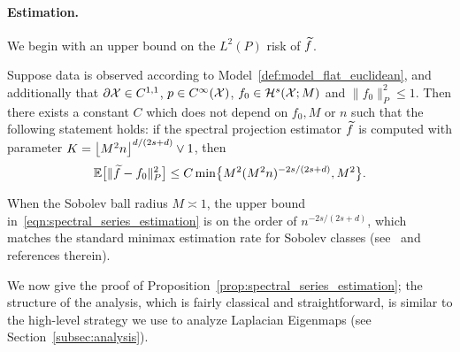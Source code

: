 \paragraph{Estimation.}
We begin with an upper bound on the $L^2(P)$ risk of $\widetilde{f}$.
\begin{proposition}
	\label{prop:spectral_series_estimation}
	Suppose data is observed according to Model~\ref{def:model_flat_euclidean}, and additionally that $\partial \mathcal{X} \in C^{1,1}$, $p \in C^{\infty}(\mathcal{X})$, $f_0 \in \mathcal{H}^{s}(\mathcal{X};M)$ and $\|f_0\|_P^2 \leq 1$. Then there exists a constant $C$ which does not depend on $f_0,M$ or $n$ such that the following statement holds: if the spectral projection estimator $\widetilde{f}$ is computed with parameter $K = \left\lfloor M^2n \right\rfloor^{d/(2s + d)} \vee 1$, then
	\begin{equation}
	\label{eqn:spectral_series_estimation}
	\mathbb{E}\bigl[\|\widetilde{f} - f_0\|_P^2\bigr] \leq C \min\bigl\{M^2(M^2n)^{-2s/(2s + d)}, M^2\bigr\}.
	\end{equation}
\end{proposition}
When the Sobolev ball radius $M \asymp 1$, the upper bound in~\eqref{eqn:spectral_series_estimation} is on the order of $n^{-2s/(2s + d)}$, which matches the standard minimax estimation rate for Sobolev classes (see~\cite{wasserman2006,tsybakov08} and references therein). 


We now give the proof of Proposition~\ref{prop:spectral_series_estimation}; the structure of the analysis, which is fairly classical and straightforward, is similar to the high-level strategy we use to analyze Laplacian Eigenmaps (see Section~\ref{subsec:analysis}).

